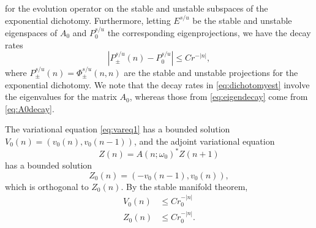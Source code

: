 \documentclass[12pt]{article}
\begin{document}
for the evolution operator on the stable and unstable subspaces of the exponential dichotomy. Furthermore, letting $E^{s/u}$ be the stable and unstable eigenspaces of $A_0$ and $P_0^{s/u}$ the corresponding eigenprojections, we have the decay rates
\begin{equation}\label{eq:eigendecay}
	|P_\pm^{s/u}(n) - P_0^{s/u}| \leq C r^{-|n|},
\end{equation}
where $P_\pm^{s/u}(n) = \Phi_\pm^{s/u}(n, n)$ are the stable and unstable projections for the exponential dichotomy. We note that the decay rates in \cref{eq:dichotomyest} involve the eigenvalues for the matrix $A_0$, whereas those from \cref{eq:eigendecay} come from \cref{eq:A0decay}. 

The variational equation \cref{eq:vareq1} has a bounded solution $V_0(n) = (v_0(n), v_0(n-1))$, and the adjoint variational equation 
\begin{equation}\label{eq:adjvareq1}
	Z(n) = A(n; \omega_0)^* Z(n+1)
\end{equation}
has a bounded solution 
\begin{equation}\label{eq:Z0}
	Z_0(n) = (-v_0(n-1), v_0(n)),
\end{equation}
which is orthogonal to $Z_0(n)$. By the stable manifold theorem,
\begin{equation}\label{eq:VZ0estimates}
	\begin{aligned}
		V_0(n) &\leq C r_0^{-|n|} \\
		Z_0(n) &\leq C r_0^{-|n|}.
	\end{aligned}
\end{equation}
\end{document}
